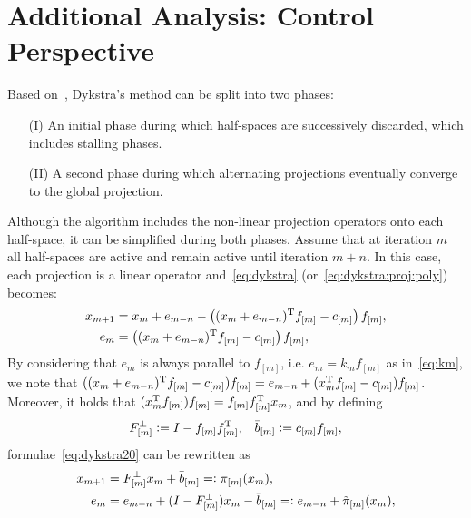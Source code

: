 \documentclass[hidelinks]{article}
\begin{document}
\section{Additional Analysis: Control Perspective}

Based on~\cite{DYKSTRAPERKINS}, Dykstra's method can be split into two phases:
\begin{enumerate}
\item[(I)] An initial phase during which half-spaces are successively discarded, which includes stalling phases.
\item[(II)] A second phase during which alternating projections eventually converge to the global projection.
\end{enumerate}

Although the algorithm includes the non-linear projection operators onto each half-space, it can be simplified during both phases. Assume that at iteration $m$ all half-spaces are active and remain active until iteration $m+n$. In this case, each projection is a linear operator and~\eqref{eq:dykstra} (or~\eqref{eq:dykstra:proj:poly}) becomes:
\begin{subequations}\label{eq:dykstra20}
\begin{align}
x_{m+1}&=x_{m}+e_{m-n} - \left((x_{m}+e_{m-n})^{\text{T}} f_{[m]} - c_{[m]}\right) f_{[m]},\label{eq:dykstra:proj20}\\
e_m&=\left((x_{m}+e_{m-n})^{\text{T}} f_{[m]} - c_{[m]}\right) f_{[m]}\label{eq:dykstra:error20},
\end{align}
\end{subequations}
By considering that $e_m$ is always parallel to $f_{[m]}$, i.e. $e_m=k_mf_{[m]}$ as in~\eqref{eq:km}, we note that $((x_{m}+e_{m-n})^{\text{T}} f_{[m]} - c_{[m]}) f_{[m]} = e_{m-n} + (x_{m}^{\text{T}} f_{[m]} - c_{[m]}) f_{[m]}$. Moreover, it holds that $(x_{m}^{\text{T}} f_{[m]}) f_{[m]} = f_{[m]} f_{[m]}^{\text{T}} x_{m}$, and by defining
\begin{align*}
&F^\perp_{[m]}\vcentcolon= I-f_{[m]}f_{[m]}^{\text{T}},
&\bar{b}_{[m]}\vcentcolon= c_{[m]} f_{[m]},
\end{align*}
formulae~\eqref{eq:dykstra20} can be rewritten as
\begin{subequations}\label{eq:dykstra2}
\begin{align}
x_{m+1}&=F^\perp_{[m]}x_{m}+\bar{b}_{[m]}=\vcentcolon \pi_{[m]}(x_{m}),\label{eq:dykstra:proj2}\\
e_m&=e_{m-n}+(I-F^\perp_{[m]})x_{m}-\bar{b}_{[m]} =\vcentcolon e_{m-n}+\tilde{\pi}_{[m]}(x_{m}),\label{eq:dykstra:error2}
\end{align}
\end{subequations}
\end{document}
